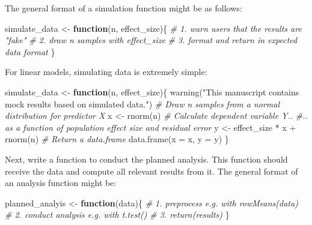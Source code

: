 \documentclass[psych,tutorial,submit,moreauthors,pdftex]{mdpi}
\newenvironment{Shaded}{\begin{snugshade}}{\end{snugshade}}
\newcommand{\AttributeTok}[1]{\textcolor[rgb]{0.77,0.63,0.00}{#1}}
\newcommand{\CommentTok}[1]{\textcolor[rgb]{0.56,0.35,0.01}{\textit{#1}}}
\newcommand{\ControlFlowTok}[1]{\textcolor[rgb]{0.13,0.29,0.53}{\textbf{#1}}}
\newcommand{\FunctionTok}[1]{\textcolor[rgb]{0.00,0.00,0.00}{#1}}
\newcommand{\NormalTok}[1]{#1}
\newcommand{\OtherTok}[1]{\textcolor[rgb]{0.56,0.35,0.01}{#1}}
\newcommand{\SpecialCharTok}[1]{\textcolor[rgb]{0.00,0.00,0.00}{#1}}
\newcommand{\StringTok}[1]{\textcolor[rgb]{0.31,0.60,0.02}{#1}}
\begin{document}
The general format of a simulation function might be as follows:

\begin{Shaded}
\begin{Highlighting}[]
\NormalTok{simulate\_data }\OtherTok{\textless{}{-}} \ControlFlowTok{function}\NormalTok{(n, effect\_size)\{}
  \CommentTok{\# 1. warn users that the results are "fake"}
  \CommentTok{\# 2. draw \textasciigrave{}n\textasciigrave{} samples with \textasciigrave{}effect\_size\textasciigrave{}}
  \CommentTok{\# 3. format and return in expected data format}
\NormalTok{\}}
\end{Highlighting}
\end{Shaded}

For linear models, simulating data is extremely simple:

\begin{Shaded}
\begin{Highlighting}[]
\NormalTok{simulate\_data }\OtherTok{\textless{}{-}} \ControlFlowTok{function}\NormalTok{(n, effect\_size)\{}
  \FunctionTok{warning}\NormalTok{(}\StringTok{"This manuscript contains mock results based on simulated data."}\NormalTok{)}
  \CommentTok{\# Draw n samples from a normal distribution for predictor X}
\NormalTok{  x }\OtherTok{\textless{}{-}} \FunctionTok{rnorm}\NormalTok{(n)}
  \CommentTok{\# Calculate dependent variable Y..}
  \CommentTok{\#.. as a function of population effect size and residual error}
\NormalTok{  y }\OtherTok{\textless{}{-}}\NormalTok{ effect\_size }\SpecialCharTok{*}\NormalTok{ x }\SpecialCharTok{+} \FunctionTok{rnorm}\NormalTok{(n)}
  \CommentTok{\# Return a data.frame}
  \FunctionTok{data.frame}\NormalTok{(}\AttributeTok{x =}\NormalTok{ x, }\AttributeTok{y =}\NormalTok{ y)}
\NormalTok{\}}
\end{Highlighting}
\end{Shaded}

Next, write a function to conduct the planned analysis. This function
should receive the data and compute all relevant results from it. The
general format of an analysis function might be:

\begin{Shaded}
\begin{Highlighting}[]
\NormalTok{planned\_analyis }\OtherTok{\textless{}{-}} \ControlFlowTok{function}\NormalTok{(data)\{}
  \CommentTok{\# 1. preprocess e.g. with \textasciigrave{}rowMeans(data)\textasciigrave{}}
  \CommentTok{\# 2. conduct analysis e.g. with \textasciigrave{}t.test()\textasciigrave{}}
  \CommentTok{\# 3. \textasciigrave{}return(results)\textasciigrave{}}
\NormalTok{\}}
\end{Highlighting}
\end{Shaded}
\end{document}
